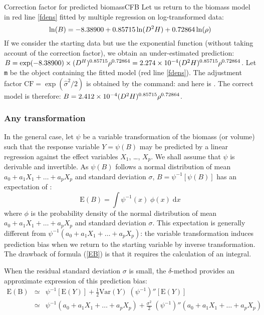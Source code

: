 \begin{filrouge}{Correction factor for predicted biomass}{CFB}%
Let us return to the biomass model in red line \ref{fdens} fitted by multiple regression on log-transformed data:
\[
\ln(B)=-\mbox{8.38900}+\mbox{0.85715}\ln(D^2H)+\mbox{0.72864}\ln(\rho)
\]
If we consider the starting data but use the exponential function (without taking account of the correction factor), we obtain an under-estimated prediction: 
$B=\exp(-\mbox{8.38900})\times
(D^H)^{0.85715}\rho^{0.72864}=\mbox{2.274}\times10^{-4}(D^2H)^{0.85715}\rho^{0.72864}$.
Let \texttt{m} be the object containing the fitted model (red line 
\ref{fdens}). The adjustment factor 
$\mathrm{CF}=\exp(\hat{\sigma}^2/2)$ is obtained by the command:
%
and here is . The correct model is therefore:
$B=\mbox{2.412}\times10^{-4}(D^2H)^{0.85715}\rho^{0.72864}$.
\end{filrouge}

\subsubsection{Any transformation}

In the general case, let $\psi$ be a variable transformation of the biomass (or volume) such that the response variable $Y=\psi(B)$ may be predicted by a linear regression against the effect variables $X_1$, \ldots, $X_p$. We shall assume that $\psi$ is derivable and invertible. As 
$\psi(B)$ follows a normal distribution of mean
$a_0+a_1X_1+\ldots+a_pX_p$ and standard deviation $\sigma$,
$B=\psi^{-1}[\psi(B)]$ has an expectation of \citep[p.26]{saporta90}:
\begin{equation}
\mathrm{E}(B)=\int\psi^{-1}(x)\;\phi(x)\;\mathrm{d}x\label{EB}
\end{equation}
where $\phi$ is the probability density of the normal distribution of mean $a_0+a_1X_1+\ldots+a_pX_p$ and standard deviation $\sigma$. This expectation is generally different from 
$\psi^{-1}(a_0+a_1X_1+\ldots +a_pX_p)$: the variable transformation induces prediction bias when we return to the starting variable by inverse transformation. The drawback of formula 
(\ref{EB}) is that it requires the calculation of an integral.

When the residual standard deviation $\sigma$ is small, the 
$\delta$-method \citep{serfling80} provides an approximate expression of this prediction bias:
\begin{eqnarray*}
\mathrm{E}(\mathrm{B}) &\simeq&
\psi^{-1}[\mathrm{E}(Y)]+\frac{1}{2}\mathrm{Var}(Y)\;
(\psi^{-1})''[\mathrm{E}(Y)]
\\ &\simeq& \psi^{-1}(a_0+a_1X_1+\ldots+a_pX_p)+\frac{\sigma^2}{2}\;
(\psi^{-1})''(a_0+a_1X_1+\ldots+a_pX_p)
\end{eqnarray*}


